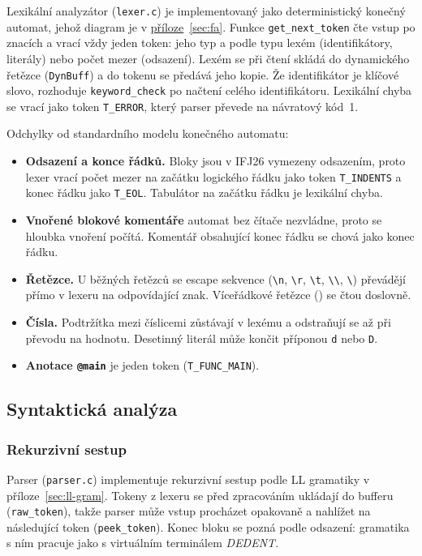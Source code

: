 \documentclass[11pt]{article}
\newcommand{\file}[1]{\texttt{#1}}                   %
\newcommand{\ic}[1]{\texttt{#1}}                     %
\newcommand{\dq}{\textquotedbl{}}                    %
\begin{document}
Lexikální analyzátor (\file{lexer.c}) je implementovaný jako deterministický konečný automat, jehož diagram je v \hyperref[sec:fa]{příloze}~\ref{sec:fa}. Funkce \texttt{get\_next\_token} čte vstup po znacích a vrací vždy jeden token: jeho typ a podle typu lexém (identifikátory, literály) nebo počet mezer (odsazení). Lexém se při čtení skládá do dynamického řetězce (\file{DynBuff}) a do tokenu se předává jeho kopie. Že identifikátor je klíčové slovo, rozhoduje \texttt{keyword\_check} po načtení celého identifikátoru. Lexikální chyba se vrací jako token \texttt{T\_ERROR}, který parser převede na návratový kód~1.

Odchylky od standardního modelu konečného automatu:
\begin{itemize}
  \item \textbf{Odsazení a konce řádků.} Bloky jsou v IFJ26 vymezeny odsazením, proto lexer vrací počet mezer na začátku logického řádku jako token \texttt{T\_INDENTS} a konec řádku jako \texttt{T\_EOL}. Tabulátor na začátku řádku je lexikální chyba.
  \item \textbf{Vnořené blokové komentáře} automat bez čítače nezvládne, proto se hloubka vnoření počítá. Komentář obsahující konec řádku se chová jako konec řádku.
  \item \textbf{Řetězce.} U běžných řetězců se escape sekvence (\texttt{\textbackslash n}, \texttt{\textbackslash r}, \texttt{\textbackslash t}, \texttt{\textbackslash\textbackslash}, \texttt{\textbackslash\dq}) převádějí přímo v lexeru na odpovídající znak. Víceřádkové řetězce (\texttt{\dq\dq\dq}) se čtou doslovně.
  \item \textbf{Čísla.} Podtržítka mezi číslicemi zůstávají v lexému a odstraňují se až při převodu na hodnotu. Desetinný literál může končit příponou \texttt{d} nebo \texttt{D}.
  \item \textbf{Anotace \ic{@main}} je jeden token (\texttt{T\_FUNC\_MAIN}).
\end{itemize}

\subsection{Syntaktická analýza}

\subsubsection{Rekurzivní sestup}

Parser (\file{parser.c}) implementuje rekurzivní sestup podle LL gramatiky v příloze~\ref{sec:ll-gram}. Tokeny z lexeru se před zpracováním ukládají do bufferu (\texttt{raw\_token}), takže parser může vstup procházet opakovaně a nahlížet na následující token (\texttt{peek\_token}). Konec bloku se pozná podle odsazení: gramatika s ním pracuje jako s virtuálním terminálem \textit{DEDENT}.
\end{document}
